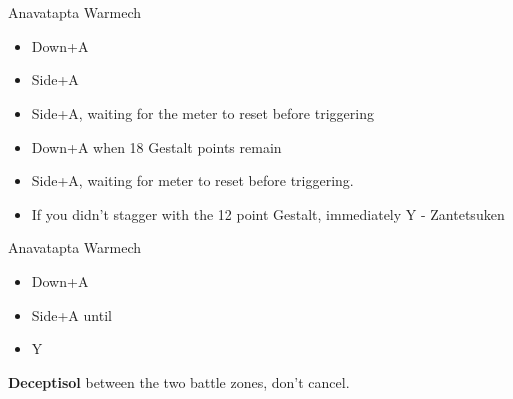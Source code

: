 \chapter[Chapter 12]{}
\begin{paracol}{2}
\begin{battle}{Anavatapta Warmech}
	\begin{itemize}
		\item Down+A
		\item Side+A
			      \item Side+A, waiting for the meter to reset before triggering
			      \item Down+A when 18 Gestalt points remain
			      \item Side+A, waiting for meter to reset before triggering.
			      \item If you didn't stagger with the 12 point Gestalt, immediately Y - Zantetsuken
	\end{itemize}
\end{battle}
\switchcolumn
\begin{battle}{Anavatapta Warmech}
\begin{itemize}
    \item Down+A
    \item Side+A until \stagger
    \item Y
\end{itemize}
\end{battle}
\switchcolumn*
{}

\textbf{Deceptisol} between the two battle zones, don't cancel.
\switchcolumn
{}


\end{paracol}
